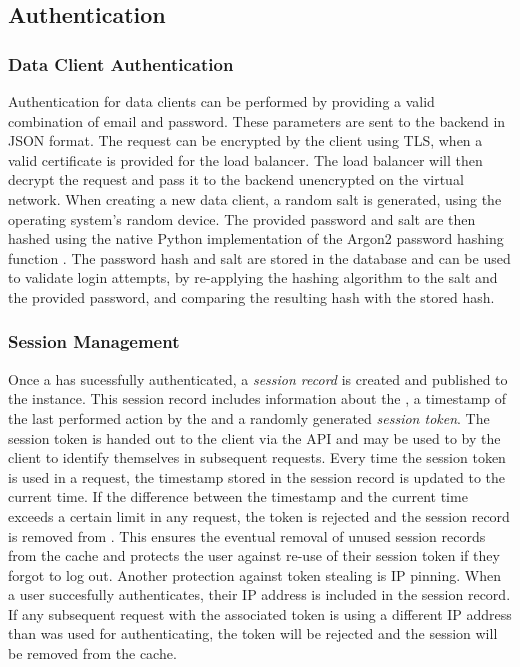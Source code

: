 \subsection{Authentication}
    \subsubsection{Data Client Authentication}
        Authentication for data clients can be performed by providing
        a valid combination of email and password. These parameters
        are sent to the backend in JSON format. The request
        can be encrypted by the client using TLS, when a valid
        certificate is provided for the load balancer. The load balancer
        will then decrypt the request and pass it to the backend unencrypted
        on the virtual network. When creating a new data client,
        a random salt is generated, using the operating system's
        random device. The provided password and salt are then hashed
        using the native Python implementation of the Argon2 password hashing function \cite{argon2}.
        The password hash and salt are stored in
        the database and can be used to validate login attempts,
        by re-applying the hashing algorithm to the salt and the provided
        password, and comparing the resulting hash with the stored hash.

    \subsubsection{Session Management}
        Once a  has sucessfully authenticated, a \textit{session record}
        is created and published to the  instance.
        This session record includes information about the
        , a timestamp of the last performed action by the 
        and a randomly generated \textit{session token}.
        The session token is handed out to the client via the API
        and may be used to by the client to identify themselves
        in subsequent requests. Every time the session token is used
        in a request, the timestamp stored in the session record is
        updated to the current time. If the difference between
        the timestamp and the current time exceeds a certain limit
        in any request, the token is rejected and the session record
        is removed from . This ensures the eventual
        removal of unused session records from the cache and protects
        the user against re-use of their session token if they forgot
        to log out. Another protection against token stealing
        is IP pinning. When a user succesfully authenticates,
        their IP address is included in the session record.
        If any subsequent request with the associated token
        is using a different IP address than was used for authenticating,
        the token will be rejected and the session will be removed
        from the cache.

